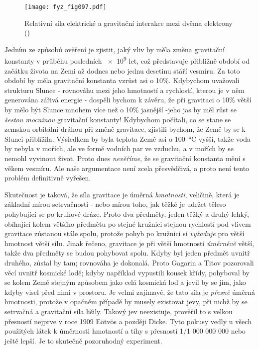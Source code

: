     \begin{figure}[ht!]  %
      \centering
      \texttt{[image: fyz\_fig097.pdf]}
      \caption{Relativní síla elektrické a gravitační interakce mezi dvěma elektrony
               (\cite[s.~104]{Feynman01})}
      \label{fyz:fig097}
    \end{figure}
    Jedním ze způsobů ověření je zjistit, jaký vliv by měla změna gravitační konstanty v průběhu 
    posledních \num{e9} let, což představuje přibližně období od začátku života na Zemi až dodnes 
    nebo jednu desetinu stáří vesmíru. Za toto období by měla gravitační konstanta vzrůst asi o 
    10\%. Kdybychom uvažovali strukturu Slunce - rovnováhu mezi jeho hmotností a rychlostí, kterou 
    je v něm generována zářivá energie - dospěli bychom k závěru, že při gravitaci o 10\% větší by 
    mělo být Slunce mnohem více než o 10\% jasnější -jeho jas by měl růst se \emph{šestou mocninou} 
    gravitační konstanty! Kdybychom počítali, co se stane se zemskou orbitální dráhou při změně 
    gravitace, zjistili bychom, že Země by se k Slunci přiblížila. Výsledkem by byla teplota Země 
    asi o \SI{100} {\degreeCelsius} vyšší, takže voda by nebyla v mořích, ale ve formě vodních par 
    ve vzduchu, a v mořích by se nemohl vyvinout život. Proto dnes \emph{nevěříme}, že se 
    gravitační konstanta mění s věkem vesmíru. Ale naše argumentace není zcela přesvědčivá, a proto 
    není tento problém definitivně vyřešen.
    
    Skutečnost je taková, že síla gravitace je úměrná \emph{hmotnosti}, veličině, která je základní 
    mírou setrvačnosti - nebo mírou toho, jak těžké je udržet těleso pohybující se po kruhové 
    dráze. Proto dva předměty, jeden těžký a druhý lehký, obíhající kolem většího předmětu po 
    stejné kružnici stejnou rychlostí pod vlivem gravitace zůstanou stále spolu, protože pohyb po 
    kružnici si \emph{vyžaduje} pro větší hmotnost větší sílu. Jinak řečeno, gravitace je při větší 
    hmotnosti \emph{úměrněvě} větší, takže dva předměty se budou pohybovat spolu. Kdyby byl jeden 
    předmět uvnitř druhého, zůstal by tam; rovnováha je dokonalá. Proto Gagarin a Titov pozorovali 
     věcí uvnitř kosmické lodě; kdyby například vypustili kousek křídy, pohyboval by 
    se kolem Země stejným způsobem jako celá kosmická loď a jevil by se jim, jako kdyby visel před 
    nimi v prostoru. Je velmi zajímavé, že tato síla je	\emph{přesně} úměrná hmotnosti, protože v 
    opačném případě by musely existovat jevy, při nichž by se setrvačná a gravitační síla lišily. 
    Takový jev neexistuje, prověřil to s velkou přesností nejprve v roce \num{1909} E\"{o}tv\"{o}s 
    a později Dicke. Tyto pokusy vedly u všech použitých látek k úměrnosti hmotností a tíhy s 
    přesností \num{1/1 000 000 000} nebo ještě lepší. Je to skutečně pozoruhodný experiment.
    
